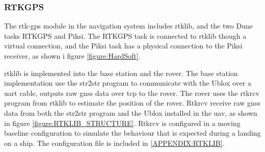 \subsubsection{RTKGPS}
The \gls{rtk-gps} module in the navigation system includes \gls{rtklib}, and the two Dune tasks RTKGPS and Piksi. The RTKGPS task is connected to \gls{rtklib} though a virtual connection, and the Piksi task has a physical connection to the Piksi receiver, as shown i figure \ref{figure:HardSoft}.


\gls{rtklib} is implemented into the base station and the rover. The base station implementation use the  str2str program to communicate with the Ublox over a uart cable, outputs raw \gls{gnss} data over tcp to the rover.
The rover uses the rtkrcv program from \gls{rtklib} to estimate the position of the rover. Rtkrcv receive raw \gls{gnss} data from both the str2str program and the Ublox installed in the \gls{uav}, as shown in figure \ref{figure:RTKLIB_STRUCTURE}. Rtkrcv is configured in a moving baseline configuration to simulate the behaviour that is expected during a landing on a ship. The configuration file is included in \ref{APPENDIX:RTKLIB}.

